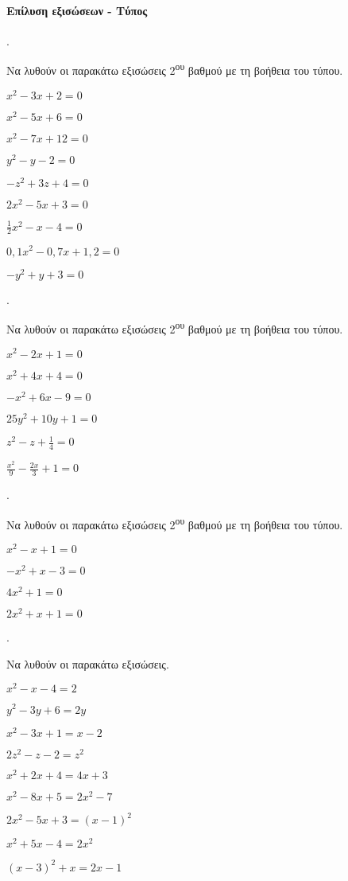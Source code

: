 \documentclass[11pt,a4paper,twocolumn]{article}
\newcounter{askhsh}
\newcommand{\askhsh}{{\large\theaskhsh.}\ \addtocounter{askhsh}{1}}
\begin{document}
\paragraph{Επίλυση εξισώσεων - Τύπος}
\askhsh Να λυθούν οι παρακάτω εξισώσεις 2\textsuperscript{ου} βαθμού με τη βοήθεια του τύπου.
\begin{multicols}{2}
\begin{alist}[leftmargin=5mm]
\item $ x^2-3x+2=0 $
\item $ x^2-5x+6=0 $
\item $ x^2-7x+12=0 $
\item $ y^2-y-2=0 $
\item $ -z^2+3z+4=0 $
\item $ 2x^2-5x+3=0 $
\item $ \frac{1}{2}x^2-x-4=0 $
\item {\small $ 0{,}1x^2-0{,}7x+1{,}2=0 $}
\item $ -y^2+y+3=0 $
\end{alist}
\end{multicols}
\askhsh Να λυθούν οι παρακάτω εξισώσεις 2\textsuperscript{ου} βαθμού με τη βοήθεια του τύπου.
\begin{multicols}{2}
\begin{alist}
\item $ x^2-2x+1=0 $
\item $ x^2+4x+4=0 $
\item $ -x^2+6x-9=0 $
\item $ 25y^2+10y+1=0 $
\item $ z^2-z+\frac{1}{4}=0 $
\item $ \frac{x^2}{9}-\frac{2x}{3}+1=0 $
\end{alist}
\end{multicols}
\askhsh Να λυθούν οι παρακάτω εξισώσεις 2\textsuperscript{ου} βαθμού με τη βοήθεια του τύπου.
\begin{multicols}{2}
\begin{alist}
\item $ x^2-x+1=0 $
\item $ -x^2+x-3=0 $
\item $ 4x^2+1=0 $
\item $2x^2+x+1=0$
\end{alist}
\end{multicols}
\askhsh Να λυθούν οι παρακάτω εξισώσεις.
\begin{alist}
\item $ x^2-x-4=2 $
\item $ y^2-3y+6=2y $
\item $ x^2-3x+1=x-2 $
\item $ 2z^2-z-2=z^2 $
\item $ x^2+2x+4=4x+3 $
\item $ x^2-8x+5=2x^2-7 $
\item $ 2x^2-5x+3=(x-1)^2 $
\item $ x^2+5x-4=2x^2 $
\item $ (x-3)^2+x=2x-1 $
\end{alist}
\end{document}
